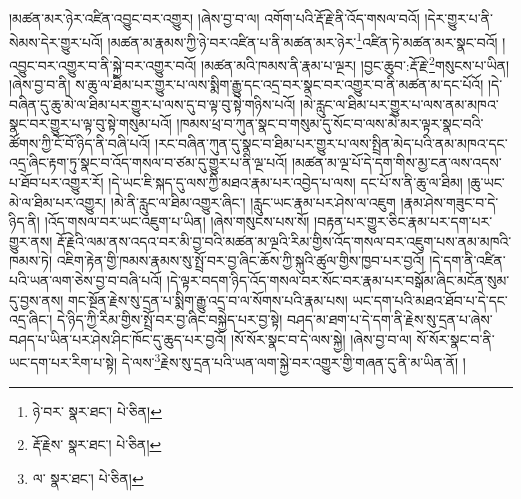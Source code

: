 །མཚན་མར་ཉེར་འཛིན་འབྱུང་བར་འགྱུར། །ཞེས་བྱ་བ་ལ། འགོག་པའི་རྡོ་རྗེ་ནི་འོད་གསལ་བའོ། །དེར་གྱུར་པ་ནི་སེམས་དེར་གྱུར་པའོ། །མཚན་མ་རྣམས་ཀྱི་ཉེ་བར་འཛིན་པ་ནི་མཚན་མར་ཉེར་\footnote{ཉེ་བར་  སྣར་ཐང་།  པེ་ཅིན། }འཛིན་ཏེ་མཚན་མར་སྣང་བའོ། །འབྱུང་བར་འགྱུར་བ་ནི་སྐྱེ་བར་འགྱུར་བའོ། །མཚན་མའི་ཁམས་ནི་རྣམ་པ་ལྔར། །བྱང་ཆུབ་:རྡོ་རྗེ་\footnote{རྡོ་རྗེས་  སྣར་ཐང་།  པེ་ཅིན། }གསུངས་པ་ཡིན། །ཞེས་བྱ་བ་ནི། ས་ཆུ་ལ་ཐིམ་པར་གྱུར་པ་ལས་སྨིག་རྒྱུ་དང་འདྲ་བར་སྣང་བར་འགྱུར་བ་ནི་མཚན་མ་དང་པོའོ། །དེ་བཞིན་དུ་ཆུ་མེ་ལ་ཐིམ་པར་གྱུར་པ་ལས་དུ་བ་ལྟ་བུ་སྟེ་གཉིས་པའོ། །མེ་རླུང་ལ་ཐིམ་པར་གྱུར་པ་ལས་ནམ་མཁའ་སྣང་བར་གྱུར་པ་ལྟ་བུ་སྟེ་གསུམ་པའོ། །ཁམས་ཕྲ་བ་ཀུན་སྣང་བ་གསུམ་དུ་སོང་བ་ལས་མེ་མར་ལྟར་སྣང་བའི་ཚོགས་ཀྱི་ངོ་བོ་ཉིད་ནི་བཞི་པའོ། །རང་བཞིན་ཀུན་དུ་སྣང་བ་ཐིམ་པར་གྱུར་པ་ལས་སྤྲིན་མེད་པའི་ནམ་མཁའ་དང་འདྲ་ཞིང་རྟག་ཏུ་སྣང་བ་འོད་གསལ་བ་ཙམ་དུ་གྱུར་པ་ནི་ལྔ་པའོ། །མཚན་མ་ལྔ་པོ་དེ་དག་གིས་མྱ་ངན་ལས་འདས་པ་ཐོབ་པར་འགྱུར་རོ། །དེ་ཡང་ཇི་སྐད་དུ་ལས་ཀྱི་མཐའ་རྣམ་པར་འབྱེད་པ་ལས། དང་པོ་ས་ནི་ཆུ་ལ་ཐིམ། །ཆུ་ཡང་མེ་ལ་ཐིམ་པར་འགྱུར། །མེ་ནི་རླུང་ལ་ཐིམ་འགྱུར་ཞིང་། །རླུང་ཡང་རྣམ་པར་ཤེས་ལ་འཇུག །རྣམ་ཤེས་གཟུང་བ་དེ་ཉིད་ནི། །འོད་གསལ་བར་ཡང་འཇུག་པ་ཡིན། །ཞེས་གསུངས་པས་སོ། །བརྟན་པར་གྱུར་ཅིང་རྣམ་པར་དག་པར་གྱུར་ནས། རྡོ་རྗེའི་ལམ་ནས་འདའ་བར་མི་བྱ་བའི་མཚན་མ་ལྔའི་རིམ་གྱིས་འོད་གསལ་བར་འཇུག་པས་ནམ་མཁའི་ཁམས་ཏེ། འཇིག་རྟེན་གྱི་ཁམས་རྣམས་སུ་སྤྲོ་བར་བྱ་ཞིང་ཆོས་ཀྱི་སྐུའི་ཚུལ་གྱིས་ཁྱབ་པར་བྱའོ། །དེ་དག་ནི་འཛིན་པའི་ཡན་ལག་ཅེས་བྱ་བ་བཞི་པའོ། །དེ་ལྟར་བདག་ཉིད་འོད་གསལ་བར་སོང་བར་རྣམ་པར་བསྒོམ་ཞིང་མངོན་སུམ་དུ་བྱས་ནས། གང་སྔོན་རྗེས་སུ་དྲན་པ་སྨིག་རྒྱུ་འདྲ་བ་ལ་སོགས་པའི་རྣམ་པས། ཡང་དག་པའི་མཐའ་ཐོབ་པ་དེ་དང་འདྲ་ཞིང་། དེ་ཉིད་ཀྱི་རིམ་གྱིས་སྤྲོ་བར་བྱ་ཞིང་བསྐྱེད་པར་བྱ་སྟེ། བཤད་མ་ཐག་པ་དེ་དག་ནི་རྗེས་སུ་དྲན་པ་ཞེས་བཤད་པ་ཡིན་པར་ཤེས་ཤིང་ཁོང་དུ་ཆུད་པར་བྱའོ། །སོ་སོར་སྣང་བ་དེ་ལས་སྐྱེ། །ཞེས་བྱ་བ་ལ། སོ་སོར་སྣང་བ་ནི་ཡང་དག་པར་རིག་པ་སྟེ། དེ་ལས་\footnote{ལ་  སྣར་ཐང་།  པེ་ཅིན། }རྗེས་སུ་དྲན་པའི་ཡན་ལག་སྐྱེ་བར་འགྱུར་གྱི་གཞན་དུ་ནི་མ་ཡིན་ནོ། །
